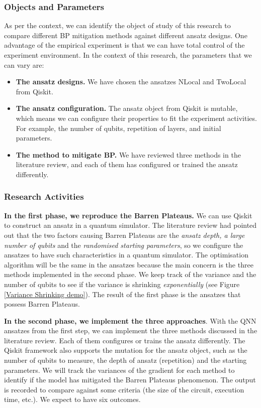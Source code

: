 \subsubsection{Objects and Parameters}

As per the context, we can identify the object of study of this research to compare different BP mitigation methods against different ansatz designs.
One advantage of the empirical experiment is that we can have total control of the experiment environment.
In the context of this research, the parameters that we can vary are:
\begin{itemize}
    \item \textbf{The ansatz designs.} We have chosen the ansatzes NLocal and TwoLocal from Qiskit.
    \item \textbf{The ansatz configuration.} The ansatz object from Qiskit is mutable, which means we can configure their properties to fit the experiment activities. For example, the number of qubits, repetition of layers, and initial parameters.
    \item \textbf{The method to mitigate BP.} We have reviewed three methods in the literature review, and each of them has configured or trained the ansatz differently.
\end{itemize}

\subsubsection{Research Activities}
\textbf{In the first phase, we reproduce the Barren Plateaus.}
We can use Qiskit \cite{Qiskit} to construct an ansatz in a quantum simulator.
The literature review had pointed out that the two factors causing Barren Plateaus are the \textit{ansatz depth, a large number of qubits} and the \textit{randomised starting parameters}, so we configure the ansatzes to have such characteristics in a quantum simulator.
The optimisation algorithm will be the same in the ansatzes because the main concern is the three methods implemented in the second phase.
We keep track of the variance and the number of qubits to see if the variance is shrinking  \textit{exponentially} (see Figure \ref{Variance Shrinking demo}).
The result of the first phase is the ansatzes that possess Barren Plateaus.

\textbf{In the second phase, we implement the three approaches}.
With the QNN ansatzes from the first step, we can implement the three methods discussed in the literature review.
Each of them configures or trains the ansatz differently.
The Qiskit framework also supports the mutation for the ansatz object, such as the number of qubits to measure, the depth of ansatz (repetition) and the starting parameters.
We will track the variances of the gradient for each method to identify if the model has mitigated the Barren Plateaus phenomenon.
The output is recorded to compare against some criteria (the size of the circuit, execution time, etc.). We expect to have six outcomes.

